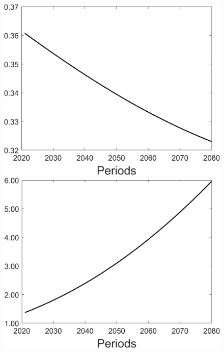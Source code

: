 \begin{figure}[h!!]
\begin{minipage}[]{0.32\textwidth}
	\end{minipage}
	\begin{minipage}[]{0.32\textwidth}
		\includegraphics[width=1\textwidth]{../../codding_model/Own/figures/Rep_agent/staticonlyRam_separate_hl_periods59_eppsilon0.40_zeta1.40_Ad08_Ac04_thetac0.70_thetad0.56_HetGrowth1_tauul0.181_util0_withtarget0_lgd0.png}
	\end{minipage}
	\begin{minipage}[]{0.32\textwidth}
		\includegraphics[width=1\textwidth]{../../codding_model/Own/figures/Rep_agent/staticonlyRam_separate_yc_periods59_eppsilon0.40_zeta1.40_Ad08_Ac04_thetac0.70_thetad0.56_HetGrowth1_tauul0.181_util0_withtarget0_lgd0.png}

\end{minipage}
\end{figure}
